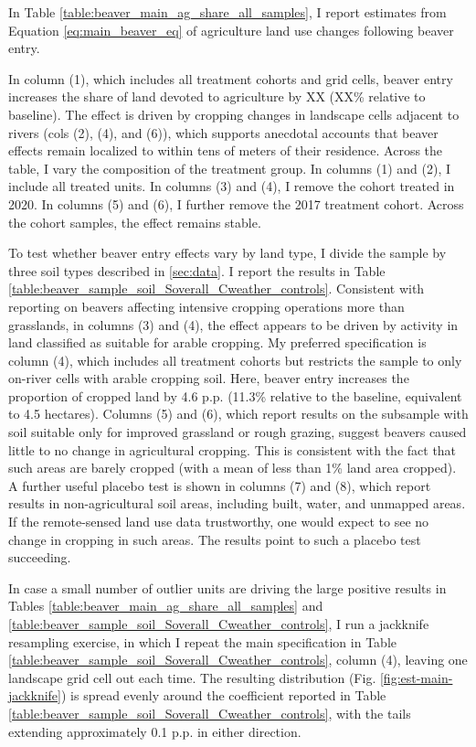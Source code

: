 In Table \ref{table:beaver_main_ag_share_all_samples}, I report estimates from Equation \ref{eq:main_beaver_eq} of agriculture land use changes following beaver entry. 

In column (1), which includes all treatment cohorts and grid cells, beaver entry increases the share of land devoted to agriculture by XX (XX\% relative to baseline). The effect is driven by cropping changes in landscape cells adjacent to rivers (cols (2), (4), and (6)), which supports anecdotal accounts that beaver effects remain localized to within tens of meters of their residence. Across the table, I vary the composition of the treatment group. In columns (1) and (2), I include all treated units. In columns (3) and (4), I remove the cohort treated in 2020. In columns (5) and (6), I further remove the 2017 treatment cohort. Across the cohort samples, the effect remains stable. 



To test whether beaver entry effects vary by land type, I divide the sample by three soil types described in \ref{sec:data}. I report the results in Table \ref{table:beaver_sample_soil_Soverall_Cweather_controls}. Consistent with reporting on beavers affecting intensive cropping operations more than grasslands, in columns (3) and (4), the effect appears to be driven by activity in land classified as suitable for arable cropping. My preferred specification is column (4), which includes all treatment cohorts but restricts the sample to only on-river cells with arable cropping soil. Here, beaver entry increases the proportion of cropped land by 4.6 p.p. (11.3\% relative to the baseline, equivalent to 4.5 hectares). Columns (5) and (6), which report results on the subsample with soil suitable only for improved grassland or rough grazing, suggest beavers caused little to no change in agricultural cropping. This is consistent with the fact that such areas are barely cropped (with a mean of less than 1\% land area cropped). A further useful placebo test is shown in columns (7) and (8), which report results in non-agricultural soil areas, including built, water, and unmapped areas. If the remote-sensed land use data trustworthy, one would expect to see no change in cropping in such areas. The results point to such a placebo test succeeding. 



In case a small number of outlier units are driving the large positive results in Tables \ref{table:beaver_main_ag_share_all_samples} and \ref{table:beaver_sample_soil_Soverall_Cweather_controls}, I run a jackknife resampling exercise, in which I repeat the main specification in Table \ref{table:beaver_sample_soil_Soverall_Cweather_controls}, column (4), leaving one landscape grid cell out each time. The resulting distribution (Fig. \ref{fig:est-main-jackknife}) is spread evenly around the coefficient reported in Table \ref{table:beaver_sample_soil_Soverall_Cweather_controls}, with the tails extending approximately 0.1 p.p. in either direction. 

